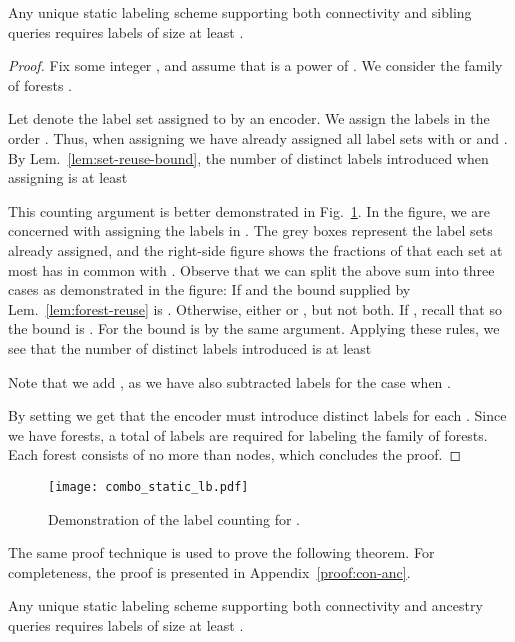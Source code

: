 \documentclass{llncs}
\begin{document}
\begin{theorem}\label{thm:static-combo-lb}
    Any unique static labeling scheme supporting both connectivity and sibling queries
    requires labels of size at  least  .
\end{theorem}
\begin{proof}
	Fix some integer , and assume that  is a power of .
    We consider the family of forests  \linebreak .

    Let  denote the label set assigned to  by an
        encoder. We  assign
        the labels in the order . Thus, when assigning  we have already assigned
        all label sets  with  or  and . By
        Lem.~\ref{lem:set-reuse-bound}, the number of distinct labels introduced
        when assigning  is at least
        
        This counting argument is better demonstrated in
        Fig.~\ref{fig:combo_static_lb}. In the figure, we are concerned with
        assigning the labels in . The grey boxes represent the label
        sets already assigned, and the right-side figure shows the fractions of
         that each set  at most has in common with . Observe
        that we can split the above sum into three cases as demonstrated in the
        figure: If  and  the bound
        supplied by Lem.~\ref{lem:forest-reuse} is . Otherwise,
        either  or , but not both. If , recall
        that  so the bound is . For  the bound is 
        by the same argument. Applying these rules, we see that the number of
        distinct labels introduced is at least
        
        Note that we add , as we have also subtracted  labels for the
        case when .

    By setting  we get that the encoder must introduce  distinct
    labels for each . Since we have  forests, a total
    of  labels are required for labeling the family of forests.
    Each forest consists of no more than  nodes, which concludes the proof.
\end{proof}
\vspace{-7ex}
\begin{figure}[htbp]
    \centering
    \texttt{[image: combo\_static\_lb.pdf]}
    \caption{Demonstration of the label counting for .}
    \label{fig:combo_static_lb}
\end{figure}

The same proof technique is used to prove the following theorem. For completeness, the proof is presented in Appendix~\ref{proof:con-anc}.
\begin{theorem}\label{thm:con-anc}
Any unique static labeling scheme supporting both connectivity and ancestry queries
requires labels of size at least .
\end{theorem}
\end{document}
